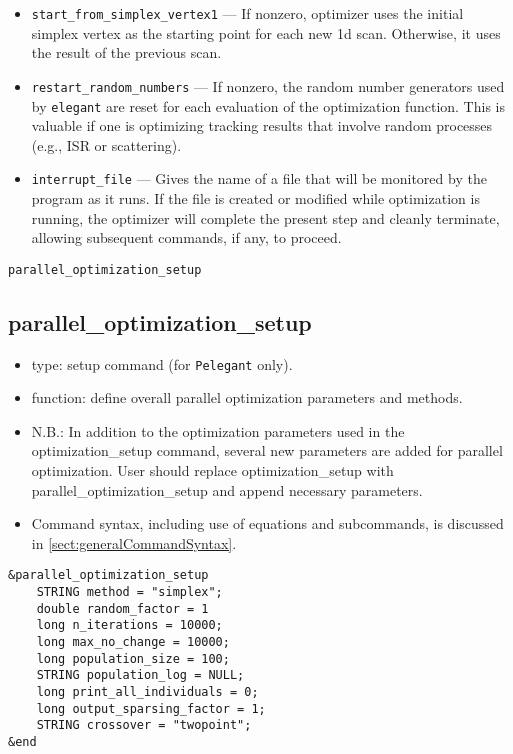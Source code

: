 \documentclass[11pt]{article}
\begin{document}
\begin{itemize}
\item \verb|start_from_simplex_vertex1| --- If nonzero, optimizer uses the initial simplex vertex as the
 starting point for each new 1d scan.  Otherwise, it uses the result of the previous scan.

\item \verb|restart_random_numbers| --- If nonzero, the random number generators used by {\tt elegant} are
 reset for each evaluation of the optimization function.  This is valuable if one is optimizing tracking
 results that involve random processes (e.g., ISR or scattering).

\item \verb|interrupt_file| --- Gives the name of a file that will be monitored by the program as it runs.
  If the file is created or modified while optimization is running, the optimizer will complete the present
  step and cleanly terminate, allowing subsequent commands, if any, to proceed.
\end{itemize}

\newpage
\begin{center}{\Large\verb|parallel_optimization_setup|}\end{center}
\subsection{parallel\_optimization\_setup \label{subsec:paralleloptimizationsetup}}

\begin{itemize}
\item type: setup command (for {\tt Pelegant} only).
\item function: define overall parallel optimization parameters and methods.
\item N.B.: In addition to the optimization parameters used in the optimization\_setup command, 	    
      several new parameters are added for parallel optimization. User should replace 
      optimization\_setup with parallel\_optimization\_setup and append necessary parameters. 
\item Command syntax, including use of equations and subcommands, is discussed in \ref{sect:generalCommandSyntax}.
\end{itemize}

\begin{verbatim}
&parallel_optimization_setup
    STRING method = "simplex";
    double random_factor = 1
    long n_iterations = 10000;
    long max_no_change = 10000;
    long population_size = 100;
    STRING population_log = NULL;
    long print_all_individuals = 0;
    long output_sparsing_factor = 1;
    STRING crossover = "twopoint";
&end
\end{verbatim}
\end{document}
